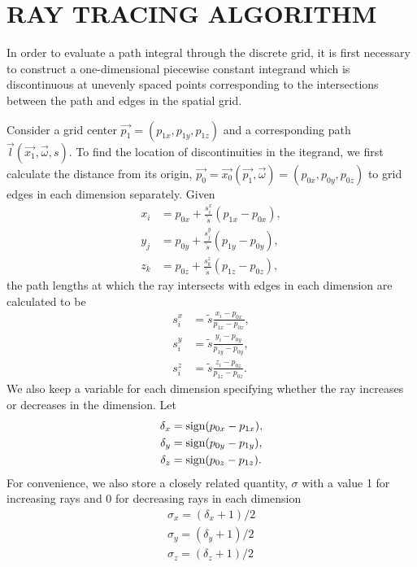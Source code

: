 \chapter{RAY TRACING ALGORITHM}
\label{chap:ray_tracing}

In order to evaluate a path integral through the discrete grid, it
is first necessary to construct a one-dimensional piecewise constant integrand
which is discontinuous at unevenly spaced points corresponding to the
intersections between the path and edges in the spatial grid.

Consider a grid center $\vec{p_1} = (p_{1x},p_{1y},p_{1z})$ and a corresponding path $\vec{l}(\vec{x_1}, \vec{\omega}, s)$.
To find the location of discontinuities in the itegrand, we first calculate the
distance from its origin, $\vec{p_0} = \vec{x_0}(\vec{p_1}, \vec{\omega}) = (p_{0x}, p_{0y}, p_{0z})$ to grid edges in each dimension
separately.
Given
\begin{align}
  x_i &= p_{0x} + \frac{s_i^x}{\tilde{s}}(p_{1x}-p_{0x}), \\
  y_j &= p_{0y} + \frac{s_j^y}{\tilde{s}}(p_{1y}-p_{0y}), \\
  z_k &= p_{0z} + \frac{s_k^z}{\tilde{s}}(p_{1z}-p_{0z}),
\end{align}
the path lengths at which the ray intersects with edges in each dimension are calculated to be
\begin{align}
  s_i^x &= \tilde{s}\frac{x_i-p_{0x}}{p_{1x}-p_{0x}}, \\
  s_i^y &= \tilde{s}\frac{y_i-p_{0y}}{p_{1y}-p_{0y}}, \\
  s_i^z &= \tilde{s}\frac{z_i-p_{0z}}{p_{1z}-p_{0z}}.
\end{align}
We also keep a variable for each dimension specifying whether the ray increases
or decreases in the dimension. Let
\begin{align}
  \delta_x &= \mbox{sign}(p_{0x}-p_{1x}), \\
  \delta_y &= \mbox{sign}(p_{0y}-p_{1y}), \\
  \delta_z &= \mbox{sign}(p_{0z}-p_{1z}).
\end{align}
For convenience, we also store a closely related quantity, $\sigma$ with a value 1 for
increasing rays and 0 for decreasing rays in each dimension
\begin{align}
  \sigma_x = (\delta_x+1)/2 \\
  \sigma_y = (\delta_y+1)/2 \\
  \sigma_z = (\delta_z+1)/2
\end{align}

